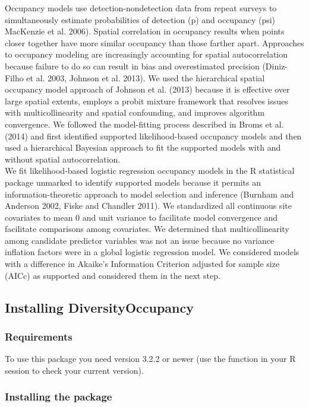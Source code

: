 \documentclass[article]{jss}
\begin{document}
Occupancy models use detection-nondetection data from repeat surveys to
simultaneously estimate probabilities of detection (p) and occupancy
(psi) MacKenzie et al. 2006). Spatial correlation in occupancy results
when points closer together have more similar occupancy than those
farther apart. Approaches to occupancy modeling are increasingly
accounting for spatial autocorrelation because failure to do so can
result in bias and overestimated precision (Diniz-Filho et al. 2003,
Johnson et al. 2013). We used the hierarchical spatial occupancy model
approach of Johnson et al. (2013) because it is effective over large
spatial extents, employs a probit mixture framework that resolves issues
with multicollinearity and spatial confounding, and improves algorithm
convergence. We followed the model-fitting process described in Broms et
al. (2014) and first identified supported likelihood-based occupancy
models and then used a hierarchical Bayesian approach to fit the
supported models with and without spatial autocorrelation.\\
We fit likelihood-based logistic regression occupancy models in the R
statistical package unmarked to identify supported models because it
permits an information-theoretic approach to model selection and
inference (Burnham and Anderson 2002, Fiske and Chandler 2011). We
standardized all continuous site covariates to mean 0 and unit variance
to facilitate model convergence and facilitate comparisons among
covariates. We determined that multicollinearity among candidate
predictor variables was not an issue because no variance inflation
factors were in a global logistic regression model. We considered models
with a difference in Akaike's Information Criterion adjusted for sample
size (AICc) as supported and considered them in the next step.

\subsection{Installing
DiversityOccupancy}\label{installing-diversityoccupancy}

\subsubsection{Requirements}\label{requirements}

To use this package you need  version 3.2.2 or newer (use
the function  in your R session to check your
current version).

\subsubsection{Installing the package}\label{installing-the-package}
\end{document}
